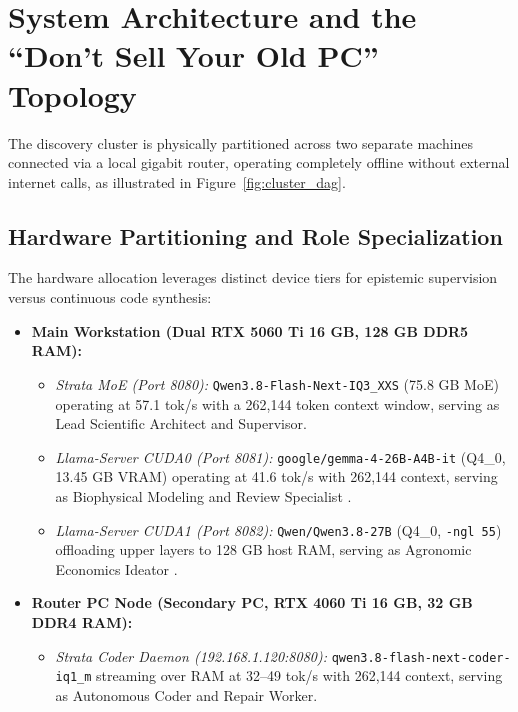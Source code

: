 \documentclass[11pt,a4paper]{article}
\begin{document}
\section{System Architecture and the ``Don't Sell Your Old PC'' Topology}
The discovery cluster is physically partitioned across two separate machines connected via a local gigabit router, operating completely offline without external internet calls, as illustrated in Figure~\ref{fig:cluster_dag}.

\subsection{Hardware Partitioning and Role Specialization}
The hardware allocation leverages distinct device tiers for epistemic supervision versus continuous code synthesis:
\begin{itemize}
    \item \textbf{Main Workstation (Dual RTX 5060 Ti 16 GB, 128 GB DDR5 RAM):}
    \begin{itemize}
        \item \textit{Strata MoE (Port 8080):} \texttt{Qwen3.8-Flash-Next-IQ3\_XXS} (75.8 GB MoE) operating at 57.1 tok/s with a 262,144 token context window, serving as Lead Scientific Architect and Supervisor.
        \item \textit{Llama-Server CUDA0 (Port 8081):} \texttt{google/gemma-4-26B-A4B-it} (Q4\_0, 13.45 GB VRAM) operating at 41.6 tok/s with 262,144 context, serving as Biophysical Modeling and Review Specialist \cite{gemma2024}.
        \item \textit{Llama-Server CUDA1 (Port 8082):} \texttt{Qwen/Qwen3.8-27B} (Q4\_0, \texttt{-ngl 55}) offloading upper layers to 128 GB host RAM, serving as Agronomic Economics Ideator \cite{qwen2024}.
    \end{itemize}
    \item \textbf{Router PC Node (Secondary PC, RTX 4060 Ti 16 GB, 32 GB DDR4 RAM):}
    \begin{itemize}
        \item \textit{Strata Coder Daemon (192.168.1.120:8080):} \texttt{qwen3.8-flash-next-coder-iq1\_m} streaming over RAM at 32--49 tok/s with 262,144 context, serving as Autonomous Coder and Repair Worker.
    \end{itemize}
\end{itemize}
\end{document}
